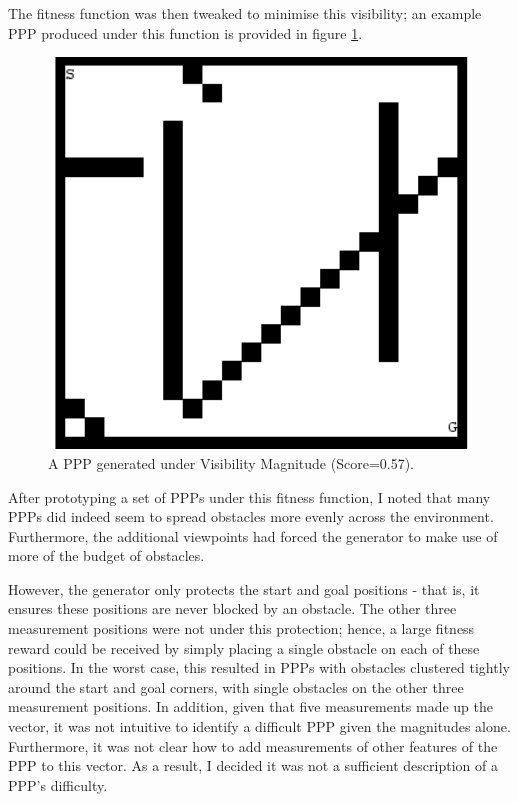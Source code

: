 \documentclass[authoryearcitations]{UoYCSproject}
\begin{document}
The fitness function was then tweaked to minimise this visibility; an example PPP produced under this function is provided in figure \ref{fig:vis_mag_ppp}.

\begin{figure}
\graphicspath{ {DesignImpPics/} }
\includegraphics[width=1\textwidth]{visMag.png}
\caption{A PPP generated under Visibility Magnitude (Score=0.57).}
\label{fig:vis_mag_ppp}
\end{figure}

After prototyping a set of PPPs under this fitness function, I noted that many PPPs did indeed seem to spread obstacles more evenly across the environment. Furthermore, the additional viewpoints had forced the generator to make use of more of the budget of obstacles. 

However, the generator only protects the start and goal positions - that is, it ensures these positions are never blocked by an obstacle. The other three measurement positions were not under this protection; hence, a large fitness reward could be received by simply placing a single obstacle on each of these positions. In the worst case, this resulted in PPPs with obstacles clustered tightly around the start and goal corners, with single obstacles on the other three measurement positions. In addition, given that five measurements made up the vector, it was not intuitive to identify a difficult PPP given the magnitudes alone. Furthermore, it was not clear how to add measurements of other features of the PPP to this vector. As a result, I decided it was not a sufficient description of a PPP's difficulty.
\end{document}
